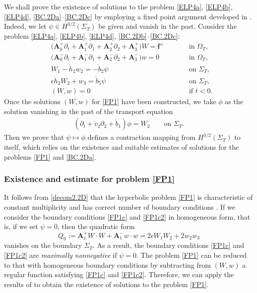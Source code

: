 \documentclass[twoside,11pt]{article}
\numberwithin{equation}{section}
\def\p{\partial}
\begin{document}
{We shall prove the existence of solutions to the problem \eqref{ELP4a}, \eqref{ELP4b}, \eqref{ELP4d}, \eqref{BC.2Da}--\eqref{BC.2Dc} by employing a fixed point argument developed in \cite{ST13MR3148595}.}
Indeed, we let $\psi\in H^{3/2}(\Sigma_{T})$ be given and vanish in the past.
Consider the problem \eqref{ELP4a}, \eqref{ELP4b}, \eqref{ELP4d}, \eqref{BC.2Db}--\eqref{BC.2Dc}: %
\begin{subequations}
	\label{FP1}
	\begin{alignat}{3}
		\label{FP1a}
		&\big({\bm{A}}_0^+\p_t  +{ \bm{A}}_1^+\p_1 +{ \bm{A}}_2^+\p_2    +{ \bm{A}}_3^+\big)W = \bm{f}^+
		&\qquad  &\textrm{in }\Omega_T,\\[2mm]
		\label{FP1b}
		& \big({ \bm{A}}_0^-\p_t  +{ \bm{A}}_1^-\p_1 +{ \bm{A}}_2^-\p_2    +{ \bm{A}}_3^-\big) w =0
		&&\textrm{in }\Omega_T,\\[0.5mm]
		\label{FP1c}
&W_1-\mathring{{h}}_2 w_2=-\mathring{b}_2 \psi
&&\textrm{on }\Sigma_T,\\
		\label{FP1c2}
&\epsilon \mathring{h}_2 W_2+w_3=\mathring{b}_5 \psi&&\textrm{on }\Sigma_T,\\[0.5mm]
		\label{FP1d}
		&
		(W,w) =0
		&& \textrm{if } t<0.
	\end{alignat}
\end{subequations}
Once the solutions $(W,w)$ for \eqref{FP1} have been constructed, we take $\phi$ as the solution vanishing in the past of the transport equation %
\begin{align}
	(\p_t+\mathring{v}_2\p_2+\mathring{b}_1)\phi=W_2
	\qquad  \textrm{on }\Sigma_T.
\end{align}
Then we prove that ${\psi}\mapsto \phi$ defines a contraction mapping from $H^{3/2}(\Sigma_{T})$ to itself, which relies on the existence and suitable estimates of solutions for the problems \eqref{FP1} and \eqref{BC.2Da}.




\subsubsection{Existence and estimate for problem \eqref{FP1}}

It follows from \eqref{decom2.2D} that the hyperbolic problem \eqref{FP1} is characteristic of  constant multiplicity
and has correct number of boundary conditions \cite{R85MR0797053,OSY95MR1346224,S95MMASMR1346663,S96aMR1401431,BGS07MR2284507}.
If we consider the boundary conditions \eqref{FP1c} and \eqref{FP1c2} in homogeneous form, that is, if we set ${\psi}=0$, then  the quadratic form
$$Q_0:= \bm{A}_1^+  W\cdot  W
+
\bm{A}_1^-  w\cdot  w= 2\epsilon W_1 W_2
+2w_2 w_3 $$
vanishes on the boundary $\Sigma_T$.
As a result, the boundary conditions \eqref{FP1c} and \eqref{FP1c2} are {\it maximally nonnegative} if $\psi=0$.
The problem \eqref{FP1} can be reduced to that with homogeneous boundary conditions by subtracting from $(W,w)$ a regular function satisfying \eqref{FP1c} and \eqref{FP1c2}.
Therefore, we can apply the results of \cite{S95MMASMR1346663,S96aMR1401431,OSY95MR1346224} to obtain the existence of solutions to the problem \eqref{FP1}.
\end{document}
